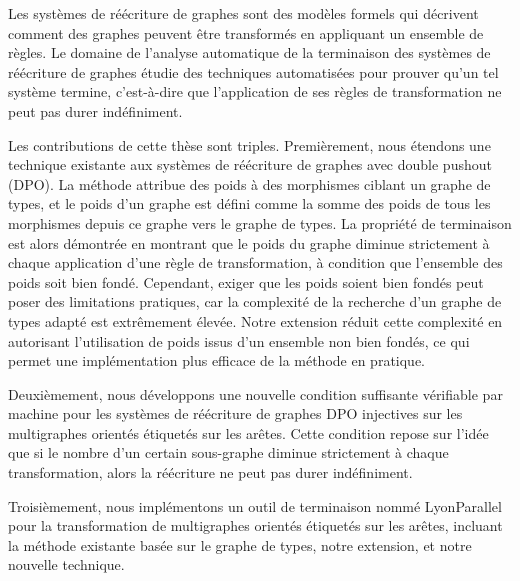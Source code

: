 Les systèmes de réécriture de graphes sont des modèles formels qui décrivent comment des graphes peuvent être transformés en appliquant un ensemble de règles. Le domaine de l'analyse automatique de la terminaison des systèmes de réécriture de graphes étudie des techniques automatisées pour prouver qu'un tel système termine, c'est-à-dire que l'application de ses règles de transformation ne peut pas durer indéfiniment.

Les contributions de cette thèse sont triples.
Premièrement, nous étendons une technique existante aux systèmes de réécriture de graphes avec double pushout (DPO). La méthode attribue des poids à des morphismes ciblant un graphe de types, et le poids d'un graphe est défini comme la somme des poids de tous les morphismes depuis ce graphe vers le graphe de types. La propriété de terminaison est alors démontrée en montrant que le poids du graphe diminue strictement à chaque application d'une règle de transformation, à condition que l'ensemble des poids soit bien fondé. Cependant, exiger que les poids soient bien fondés peut poser des limitations pratiques, car la complexité de la recherche d'un graphe de types adapté est extrêmement élevée.
Notre extension réduit cette complexité en autorisant l'utilisation de poids issus d'un ensemble non bien fondés, ce qui permet une implémentation plus efficace de la méthode en pratique.

Deuxièmement, nous développons une nouvelle condition suffisante vérifiable par machine pour les systèmes de réécriture de graphes DPO injectives sur les multigraphes orientés étiquetés sur les arêtes. Cette condition repose sur l'idée que si le nombre d'un certain sous-graphe diminue strictement à chaque transformation, alors la réécriture ne peut pas durer indéfiniment. 

Troisièmement, nous implémentons un outil de terminaison nommé LyonParallel pour la transformation de multigraphes orientés étiquetés sur les arêtes, incluant la méthode existante basée sur le graphe de types, notre extension, et notre nouvelle technique.